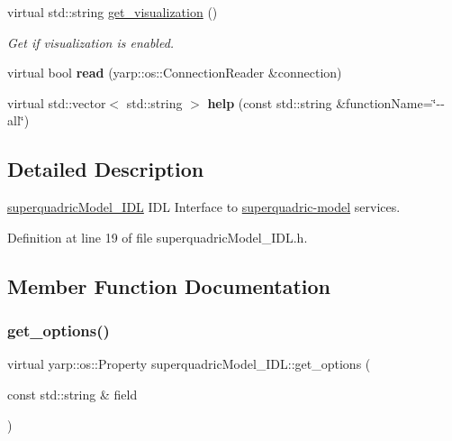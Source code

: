 \begin{DoxyCompactItemize}
virtual std\+::string \mbox{\hyperlink{classsuperquadricModel__IDL_a5d9f4f0622ba19b60218636dc108ef61}{get\+\_\+visualization}} ()
\begin{DoxyCompactList}\small\item\em Get if visualization is enabled. \end{DoxyCompactList}\item 
\mbox{\label{classsuperquadricModel__IDL_ac72a24dddca13978d7adcd5cf4f40b1f}} 
virtual bool {\bfseries read} (yarp\+::os\+::\+Connection\+Reader \&connection)
\item 
\mbox{\label{classsuperquadricModel__IDL_a263ca3dc1c7a21cc3ac40caadc95cf3d}} 
virtual std\+::vector$<$ std\+::string $>$ {\bfseries help} (const std\+::string \&function\+Name=\char`\"{}-\/-\/all\char`\"{})
\end{DoxyCompactItemize}


\subsection{Detailed Description}
\mbox{\hyperlink{classsuperquadricModel__IDL}{superquadric\+Model\+\_\+\+I\+DL}} I\+DL Interface to \mbox{\hyperlink{group__superquadric-model}{superquadric-\/model}} services. 

Definition at line 19 of file superquadric\+Model\+\_\+\+I\+D\+L.\+h.



\subsection{Member Function Documentation}
\mbox{\label{classsuperquadricModel__IDL_a50b388a29852f9d8b57a0bbb276d4675}} 
\subsubsection{\texorpdfstring{get\+\_\+options()}{get\_options()}}
{\footnotesize\ttfamily virtual yarp\+::os\+::\+Property superquadric\+Model\+\_\+\+I\+D\+L\+::get\+\_\+options (\begin{DoxyParamCaption}\item[{const std\+::string \&}]{field }\end{DoxyParamCaption})\hspace{0.3cm}{\ttfamily [virtual]}}



